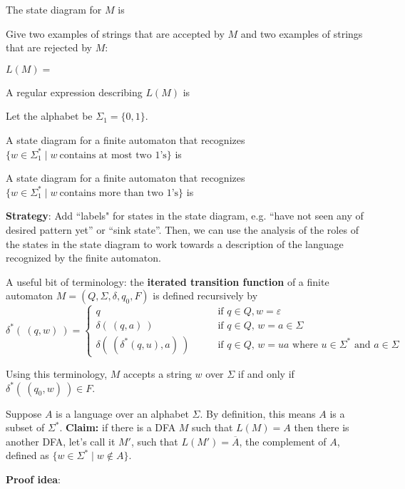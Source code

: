 \documentclass[12pt, oneside]{article}
\begin{document}
The state diagram for $M$ is 

\vfill



Give two examples of strings that are accepted by $M$ and two examples of strings that are rejected by $M$:

\vfill



$L(M) = $

A regular expression describing $L(M)$ is




\newpage
Let the alphabet be $\Sigma_1 = \{0,1\}$.

A state diagram for a finite automaton that recognizes $\{w \in \Sigma_1^* \mid w~\text{contains at most two $1$'s} \}$ is

\vfill

A state diagram for a finite automaton that recognizes $\{w \in \Sigma_1^* \mid w~\text{contains more than two $1$'s} \}$ is

\vfill

\textbf{Strategy}: Add ``labels" for states in the state diagram, e.g. 
``have not seen any of desired pattern yet'' or ``sink state''.
Then, we can use the analysis of the roles of the states in the state diagram to work towards a 
description of the language recognized by the finite automaton. 

\vfill
A useful bit of terminology: the {\bf iterated transition function} of a finite automaton
$M = (Q, \Sigma, \delta, q_0, F)$ is defined recursively by
\[
\delta^* (~(q,w)~) 
=\begin{cases}
q  \qquad &\text{if $q \in Q, w = \varepsilon$} \\
\delta( ~(q,a)~) \qquad &\text{if $q \in Q$, $w = a \in \Sigma$ } \\
\delta(~(\delta^*(q,u), a) ~) \qquad &\text{if $q \in Q$, $w = ua$ where $u \in  \Sigma^*$ and $a \in \Sigma$}
\end{cases}
\]

Using  this terminology, $M$ accepts a string $w$ over $\Sigma$ if and only if $\delta^*( ~(q_0,w)~) \in F$.

\newpage
Suppose $A$ is a language over an alphabet $\Sigma$. By definition, this means $A$ is a subset of $\Sigma^*$.
{\bf Claim:} if there is a DFA $M$ such that $L(M) = A$ then there is another DFA, let's call it $M'$, such that 
$L(M') = \overline{A}$, the complement of $A$, defined as $\{ w \in \Sigma^* \mid w \notin A \}$.

{\bf Proof idea}:
\end{document}
